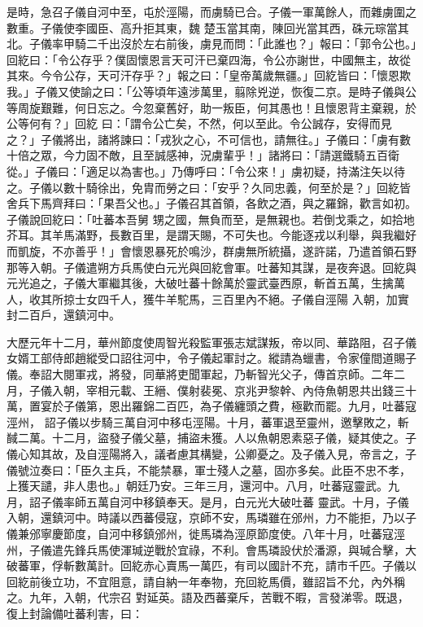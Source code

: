 \begin{pinyinscope}
 是時，急召子儀自河中至，屯於涇陽，而虜騎已合。子儀一軍萬餘人，而雜虜圍之數重。子儀使李國臣、高升拒其東，魏
 楚玉當其南，陳回光當其西，硃元琮當其北。子儀率甲騎二千出沒於左右前後，虜見而問：「此誰也？」報曰：「郭令公也。」回紇曰：「令公存乎？僕固懷恩言天可汗已棄四海，令公亦謝世，中國無主，故從其來。今令公存，天可汗存乎？」報之曰：「皇帝萬歲無疆。」回紇皆曰：「懷恩欺我。」子儀又使諭之曰：「公等頃年遠涉萬里，翦除兇逆，恢復二京。是時子儀與公等周旋艱難，何日忘之。今忽棄舊好，助一叛臣，何其愚也！且懷恩背主棄親，於公等何有？」回紇
 曰：「謂令公亡矣，不然，何以至此。令公誠存，安得而見之？」子儀將出，諸將諫曰：「戎狄之心，不可信也，請無往。」子儀曰：「虜有數十倍之眾，今力固不敵，且至誠感神，況虜輩乎！」諸將曰：「請選鐵騎五百衛從。」子儀曰：「適足以為害也。」乃傳呼曰：「令公來！」虜初疑，持滿注矢以待之。子儀以數十騎徐出，免胄而勞之曰：「安乎？久同忠義，何至於是？」回紇皆舍兵下馬齊拜曰：「果吾父也。」子儀召其首領，各飲之酒，與之羅錦，歡言如初。子儀說回紇曰：「吐蕃本吾舅
 甥之國，無負而至，是無親也。若倒戈乘之，如拾地芥耳。其羊馬滿野，長數百里，是謂天賜，不可失也。今能逐戎以利舉，與我繼好而凱旋，不亦善乎！」會懷恩暴死於鳴沙，群虜無所統攝，遂許諾，乃遣首領石野那等入朝。子儀遣朔方兵馬使白元光與回紇會軍。吐蕃知其謀，是夜奔退。回紇與元光追之，子儀大軍繼其後，大破吐蕃十餘萬於靈武臺西原，斬首五萬，生擒萬人，收其所掠士女四千人，獲牛羊駝馬，三百里內不絕。子儀自涇陽
 入朝，加實封二百戶，還鎮河中。



 大歷元年十二月，華州節度使周智光殺監軍張志斌謀叛，帝以同、華路阻，召子儀女婿工部侍郎趙縱受口詔往河中，令子儀起軍討之。縱請為蠟書，令家僮間道賜子儀。奉詔大閱軍戎，將發，同華將吏聞軍起，乃斬智光父子，傳首京師。二年二月，子儀入朝，宰相元載、王縉、僕射裴冕、京兆尹黎幹、內侍魚朝恩共出錢三十萬，置宴於子儀第，恩出羅錦二百匹，為子儀纏頭之費，極歡而罷。九月，吐蕃寇涇州，
 詔子儀以步騎三萬自河中移屯涇陽。十月，蕃軍退至靈州，邀擊敗之，斬馘二萬。十二月，盜發子儀父墓，捕盜未獲。人以魚朝恩素惡子儀，疑其使之。子儀心知其故，及自涇陽將入，議者慮其構變，公卿憂之。及子儀入見，帝言之，子儀號泣奏曰：「臣久主兵，不能禁暴，軍士殘人之墓，固亦多矣。此臣不忠不孝，上獲天譴，非人患也。」朝廷乃安。三年三月，還河中。八月，吐蕃寇靈武。九月，詔子儀率師五萬自河中移鎮奉天。是月，白元光大破吐蕃
 靈武。十月，子儀入朝，還鎮河中。時議以西蕃侵寇，京師不安，馬璘雖在邠州，力不能拒，乃以子儀兼邠寧慶節度，自河中移鎮邠州，徙馬璘為涇原節度使。八年十月，吐蕃寇涇州，子儀遣先鋒兵馬使渾瑊逆戰於宜祿，不利。會馬璘設伏於潘源，與瑊合擊，大破蕃軍，俘斬數萬計。回紇赤心賣馬一萬匹，有司以國計不充，請市千匹。子儀以回紇前後立功，不宜阻意，請自納一年奉物，充回紇馬價，雖詔旨不允，內外稱之。九年，入朝，代宗召
 對延英。語及西蕃棄斥，苦戰不暇，言發涕零。既退，復上封論備吐蕃利害，曰：




\end{pinyinscope}

